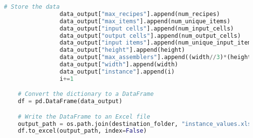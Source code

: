 \begin{lstlisting}[language=Python]
                # Store the data
                data_output["max_recipes"].append(num_recipes)
                data_output["max_items"].append(num_unique_items)
                data_output["input cells"].append(num_input_cells)
                data_output["output cells"].append(num_output_cells)
                data_output["input items"].append(num_unique_input_items)
                data_output["height"].append(height)
                data_output["max_assemblers"].append((width//3)*(height//3))
                data_output["width"].append(width)
                data_output["instance"].append(i)
                i+=1

    # Convert the dictionary to a DataFrame
    df = pd.DataFrame(data_output)

    # Write the DataFrame to an Excel file
    output_path = os.path.join(destination_folder, "instance_values.xlsx")
    df.to_excel(output_path, index=False)
\end{lstlisting} 